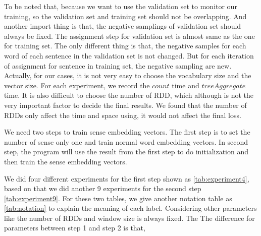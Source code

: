 To be noted that, because we want to use the validation set to monitor our training, so the validation set and training set should not be overlapping. And another import thing is that, the negative samplings of validation set should always be fixed.  The assignment step for validation set is almost same as the one for training set. The only different thing is that, the negative samples for each word of each sentence in the validation set is not changed. But for each iteration of assignment for sentence in training set, the negative sampling are new. \\

Actually, for our cases, it is not very easy to choose the vocabulary size and the vector size. For each experiment, we record the $count$ time and $treeAggregate$ time. It is also difficult to choose the number of RDD, which although is not the very important factor to decide the final results. We found that the number of RDDs only affect the time and space using, it would not affect the final loss.

We need two steps to train sense embedding vectors. The first step is to set the number of sense only one and train normal word embedding vectors. In second step, the program will use the result from the first step to do initialization and then train the sense embedding vectors.

We did four different experiments for the first step shown as \ref{tab:experiment4}, based on that we did another 9 experiments for the second step \ref{tab:experiment9}. For these two tables, we give another notation table as \ref{tab:notation} to explain the meaning of each label. Considering other parameters like the number of RDDs and window size is always fixed. The The difference for parameters between step 1 and step 2 is that, 


